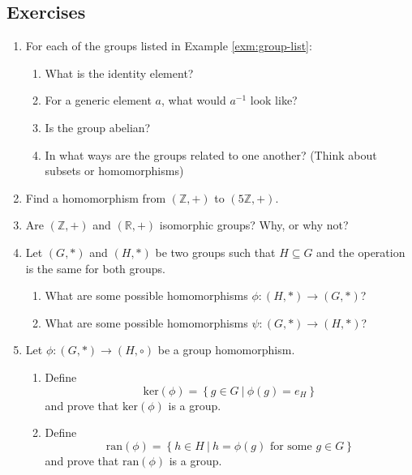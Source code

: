 \documentclass[
]{book}
\providecommand{\tightlist}{%
  \setlength{\itemsep}{0pt}\setlength{\parskip}{0pt}}
\theoremstyle{definition}
\theoremstyle{definition}
\theoremstyle{definition}
\theoremstyle{definition}
\theoremstyle{remark}
\begin{document}
\hypertarget{exercises-21}{%
\subsection{Exercises}\label{exercises-21}}

\begin{enumerate}
\def\labelenumi{\arabic{enumi}.}
\item
  For each of the groups listed in Example \ref{exm:group-list}:

  \begin{enumerate}
  \def\labelenumii{\alph{enumii}.}
  \item
    What is the identity element?
  \item
    For a generic element \(a\), what would \(a^{-1}\) look like?
  \item
    Is the group abelian?
  \item
    In what ways are the groups related to one another? (Think about subsets or homomorphisms)
  \end{enumerate}
\item
  Find a homomorphism from \(\left(\mathbb{Z}, +\right)\) to \(\left(5\mathbb{Z}, +\right)\).
\item
  Are \((\mathbb{Z},+)\) and \((\mathbb{R},+)\) isomorphic groups? Why, or why not?
\item
  Let \((G,*)\) and \((H,*)\) be two groups such that \(H\subseteq G\) and the operation is the same for both groups.

  \begin{enumerate}
  \def\labelenumii{\alph{enumii}.}
  \item
    What are some possible homomorphisms \(\phi:(H,*)\rightarrow (G,*)\)?
  \item
    What are some possible homomorphisms \(\psi:(G,*) \rightarrow (H,*)\)?
  \end{enumerate}
\item
  Let \(\phi:(G,*)\rightarrow (H,\circ)\) be a group homomorphism.

  \begin{enumerate}
  \def\labelenumii{\alph{enumii}.}
  \tightlist
  \item
    Define \[\mbox{ker}(\phi)= \left\{g\in G \: \vert \: \phi(g)=e_H\right\}\] and prove that \(\mbox{ker}(\phi)\) is a group.
  \item
    Define \[\mbox{ran}(\phi) = \left\{h\in H\: \vert \: h=\phi(g) \mbox{ for some } g\in G\right\}\] and prove that \(\mbox{ran}(\phi)\) is a group.
  \end{enumerate}
\end{enumerate}
\end{document}
